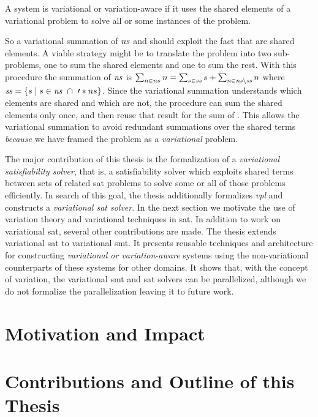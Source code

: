 \begin{definition}
  A system is variational or variation-aware if it uses the shared elements of a
  variational problem to solve all or some instances of the problem.
\end{definition}
%
So a variational summation of $\mathit{ns}$ and  should exploit the fact
that  are shared elements. A viable strategy might be to translate
the problem into two sub-problems, one to sum the shared elements and one to sum
the rest. With this procedure the summation of $\mathit{ns}$ is $\sum_{n \in{} ns} n
= \sum_{s \in{} \mathit{ss}} s + \sum_{n \in{} \mathit{ns} \setminus{} \mathit{ss}} n$ where
$\kf{ss} = \setc{s}{s \in{} \kf{ns}\ \cap{}\ \prime*{ns}}$. Since the
variational summation understands which elements are shared and which are not,
the procedure can sum the shared elements only once, and then reuse that result
for the sum of . This allows the variational summation to avoid
redundant summations over the shared terms \emph{because} we have framed the
problem as a \emph{variational} problem.

The major contribution of this thesis is the formalization of a
\emph{variational satisfiability solver}, that is, a satisfiability solver which
exploits shared terms between sets of related \acl{sat} problems to solve some
or all of those problems efficiently. In search of this goal, the thesis
additionally formalizes \emph{\acl{vpl}} and constructs a \emph{variational
  \ac{sat} solver}. In the next section we motivate the use of variation theory
and variational techniques in \acl{sat}. In addition to work on variational
\ac{sat}, several other contributions are made. The thesis extends variational
\acl{sat} to variational \ac{smt}. It presents reusable techniques and
architecture for constructing \emph{variational or variation-aware} systems
using the non-variational counterparts of these systems for other domains. It
shows that, with the concept of variation, the variational \ac{smt} and \ac{sat}
solvers can be parallelized, although we do not formalize the parallelization
leaving it to future work.

\section{Motivation and Impact}


\section{Contributions and Outline of this Thesis}


